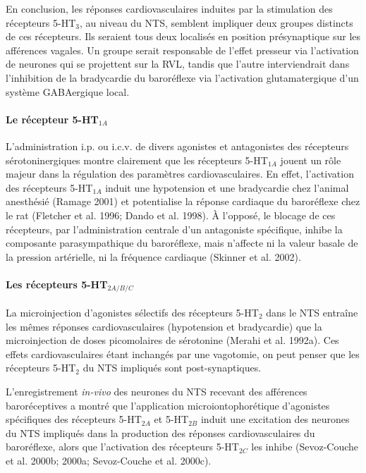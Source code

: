 \documentclass[a4paper,12pt,twoside]{report}
\begin{document}
En conclusion, les réponses cardiovasculaires induites par la stimulation des récepteurs 5-HT$_{3}$, au niveau du NTS, semblent impliquer deux groupes distincts de ces récepteurs. Ils seraient tous deux localisés en position présynaptique sur les afférences vagales. Un groupe serait responsable de l'effet presseur via l'activation de neurones qui se projettent sur la RVL, tandis que l'autre interviendrait dans l'inhibition de la bradycardie du baroréflexe via l'activation glutamatergique d'un système GABAergique local. 

\paragraph{Le récepteur 5-HT$_{1A}$}

L’administration i.p. ou i.c.v. de divers agonistes et antagonistes des récepteurs sérotoninergiques montre clairement que les récepteurs 5-HT$_{1A}$ jouent un rôle majeur dans la régulation des paramètres cardiovasculaires. En effet, l’activation des récepteurs 5-HT$_{1A}$ induit une hypotension et une bradycardie chez l’animal anesthésié (Ramage 2001) et potentialise la réponse cardiaque du baroréflexe chez le rat (Fletcher et al. 1996; Dando et al. 1998). À l’opposé, le blocage de ces récepteurs, par l’administration centrale d’un antagoniste spécifique, inhibe la composante parasympathique du baroréflexe, mais n’affecte ni la valeur basale de la pression artérielle, ni la fréquence cardiaque (Skinner et al. 2002). 

\paragraph{Les récepteurs 5-HT$_{2A/B/C}$}

La microinjection d'agonistes sélectifs des récepteurs 5-HT$_{2}$ dans le NTS entraîne les mêmes réponses cardiovasculaires (hypotension et bradycardie) que la microinjection de doses picomolaires de sérotonine (Merahi et al. 1992a). Ces effets cardiovasculaires étant inchangés par une vagotomie, on peut penser que les récepteurs 5-HT$_{2}$ du NTS impliqués sont post-synaptiques.

L’enregistrement \textit{in-vivo} des neurones du NTS recevant des afférences baroréceptives a montré que l’application microiontophorétique d’agonistes spécifiques des récepteurs 5-HT$_{2A}$ et 5-HT$_{2B}$ induit une excitation des neurones du NTS impliqués dans la production des réponses cardiovasculaires du baroréflexe, alors que l’activation des récepteurs 5-HT$_{2C}$ les inhibe (Sevoz-Couche et al. 2000b; 2000a; Sevoz-Couche et al. 2000c). 
\end{document}

